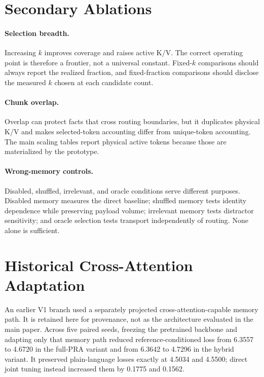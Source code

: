 \documentclass[11pt]{article}
\begin{document}
\appendix

\section{Secondary Ablations}
\label{app:ablations}

\paragraph{Selection breadth.}
Increasing $k$ improves coverage and raises active K/V. The correct operating point is
therefore a frontier, not a universal constant. Fixed-$k$ comparisons should always report
the realized fraction, and fixed-fraction comparisons should disclose the measured $k$
chosen at each candidate count.

\paragraph{Chunk overlap.}
Overlap can protect facts that cross routing boundaries, but it duplicates physical K/V
and makes selected-token accounting differ from unique-token accounting. The main scaling
tables report physical active tokens because those are materialized by the prototype.

\paragraph{Wrong-memory controls.}
Disabled, shuffled, irrelevant, and oracle conditions serve different purposes. Disabled
memory measures the direct baseline; shuffled memory tests identity dependence while
preserving payload volume; irrelevant memory tests distractor sensitivity; and oracle
selection tests transport independently of routing. None alone is sufficient.

\section{Historical Cross-Attention Adaptation}
\label{app:adaptation}

An earlier V1 branch used a separately projected cross-attention-capable memory path. It is
retained here for provenance, not as the architecture evaluated in the main paper. Across five
paired seeds, freezing the pretrained backbone and adapting only that memory path reduced
reference-conditioned loss from 6.3557 to 4.6720 in the full-PRA variant and from 6.3642 to
4.7296 in the hybrid variant. It preserved plain-language losses exactly at 4.5034 and 4.5500;
direct joint tuning instead increased them by 0.1775 and 0.1562.
\end{document}
